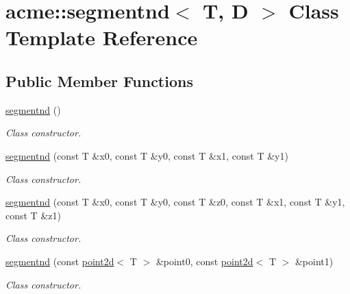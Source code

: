 \hypertarget{classacme_1_1segmentnd}{}\section{acme\+:\+:segmentnd$<$ T, D $>$ Class Template Reference}
\label{classacme_1_1segmentnd}
\subsection*{Public Member Functions}
\begin{DoxyCompactItemize}
\item 
\mbox{\label{classacme_1_1segmentnd_abec50f4ebea3cdb91588b2b05d5f5f49}} 
\hyperlink{classacme_1_1segmentnd_abec50f4ebea3cdb91588b2b05d5f5f49}{segmentnd} ()
\begin{DoxyCompactList}\small\item\em Class constructor. \end{DoxyCompactList}\item 
\mbox{\label{classacme_1_1segmentnd_abb83fe93ca44db6d03031e130f27981d}} 
\hyperlink{classacme_1_1segmentnd_abb83fe93ca44db6d03031e130f27981d}{segmentnd} (const T \&x0, const T \&y0, const T \&x1, const T \&y1)
\begin{DoxyCompactList}\small\item\em Class constructor. \end{DoxyCompactList}\item 
\mbox{\label{classacme_1_1segmentnd_ad8752db6cd23acaac5f3d906fa9105b8}} 
\hyperlink{classacme_1_1segmentnd_ad8752db6cd23acaac5f3d906fa9105b8}{segmentnd} (const T \&x0, const T \&y0, const T \&z0, const T \&x1, const T \&y1, const T \&z1)
\begin{DoxyCompactList}\small\item\em Class constructor. \end{DoxyCompactList}\item 
\hyperlink{classacme_1_1segmentnd_ad0838ae4990ff412110d11524a416b3f}{segmentnd} (const \hyperlink{classacme_1_1point2d}{point2d}$<$ T $>$ \&point0, const \hyperlink{classacme_1_1point2d}{point2d}$<$ T $>$ \&point1)
\begin{DoxyCompactList}\small\item\em Class constructor. \end{DoxyCompactList}\item 

\end{DoxyCompactItemize}
